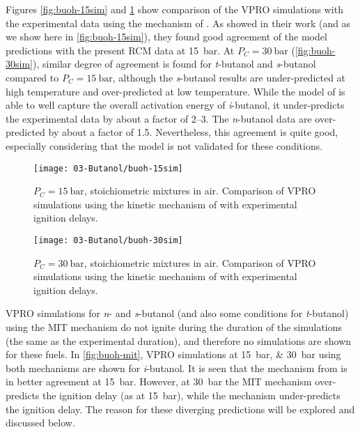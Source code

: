 \documentclass[12pt, letterpaper]{article}
\begin{document}
Figures \ref{fig:buoh-15sim} and \ref{fig:buoh-30sim} show comparison of the
VPRO simulations with the experimental data using the mechanism of
\textcite{Sarathy2012}. As \textcite{Sarathy2012} showed in their work (and as
we show here in \autoref{fig:buoh-15sim}), they found good agreement of the
model predictions with the present RCM data at \SI{15}{\bar}. At $P_C=\SI{30}{\bar}$
(\autoref{fig:buoh-30sim}), similar degree of agreement is found for
\textit{t}-butanol and \textit{s}-butanol compared to $P_C=\SI{15}{\bar}$, although
the \textit{s}-butanol results are under-predicted at high temperature and
over-predicted at low temperature. While the model of \textcite{Sarathy2012} is
able to well capture the overall activation energy of \textit{i}-butanol, it
under-predicts the experimental data by about a factor of \numrange{2}{3}. The
\textit{n}-butanol data are over-predicted by about a factor of 1.5.
Nevertheless, this agreement is quite good, especially considering that the
model is not validated for these conditions.

\begin{figure}
    \begin{floatrow}
    \ffigbox
        {\texttt{[image: 03-Butanol/buoh-15sim]}}
        {\caption{$P_C=\SI{15}{\bar}$, stoichiometric mixtures in air. Comparison of
            VPRO simulations using the kinetic mechanism of
            \textcite{Sarathy2012} with experimental ignition delays.}
        \label{fig:buoh-15sim}}
    \ffigbox
        {\texttt{[image: 03-Butanol/buoh-30sim]}}
        {\caption{$P_C=\SI{30}{\bar}$, stoichiometric mixtures in air. Comparison of
            VPRO simulations using the kinetic mechanism of
            \textcite{Sarathy2012} with experimental ignition delays.}
        \label{fig:buoh-30sim}}
    \end{floatrow}
\end{figure}

VPRO simulations for \textit{n}- and \textit{s}-butanol (and also some
conditions for \textit{t}-butanol) using the MIT mechanism
\cite{Hansen2013,Merchant2013} do not ignite during the duration of the
simulations (the same as the experimental duration), and therefore no
simulations are shown for these fuels. In \autoref{fig:buoh-mit}, VPRO
simulations at \SIlist{15;30}{\bar} using both mechanisms are shown for
\textit{i}-butanol. It is seen that the mechanism from \textcite{Sarathy2012}
is in better agreement at \SI{15}{\bar}. However, at \SI{30}{\bar} the MIT mechanism
\cite{Hansen2013,Merchant2013} over-predicts the ignition delay (as at \SI{15}{\bar}),
while the \textcite{Sarathy2012} mechanism under-predicts the ignition delay.
The reason for these diverging predictions will be explored and discussed below.
\end{document}
